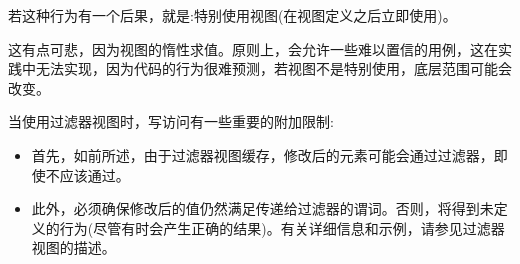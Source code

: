 若这种行为有一个后果，就是:特别使用视图(在视图定义之后立即使用)。

这有点可悲，因为视图的惰性求值。原则上，会允许一些难以置信的用例，这在实践中无法实现，因为代码的行为很难预测，若视图不是特别使用，底层范围可能会改变。


当使用过滤器视图时，写访问有一些重要的附加限制:

\begin{itemize}
\item
首先，如前所述，由于过滤器视图缓存，修改后的元素可能会通过过滤器，即使不应该通过。

\item
此外，必须确保修改后的值仍然满足传递给过滤器的谓词。否则，将得到未定义的行为(尽管有时会产生正确的结果)。有关详细信息和示例，请参见过滤器视图的描述。
\end{itemize}

